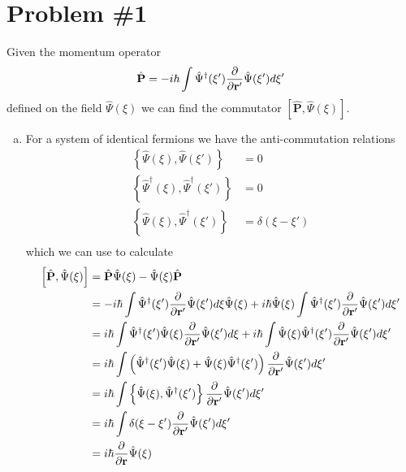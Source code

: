 \documentclass[11pt]{article}
\numberwithin{equation}{section}
\begin{document}


\section{Problem \#1}
Given the momentum operator
$$\hat{\mathbf{P}} = -i\hbar\int\hat{\Psi}^{\dagger}(\xi')\frac{\partial{}}{\partial{\mathbf{r}'}}\hat{\Psi}(\xi')d\xi'$$
defined on the field $\hat{\Psi}(\xi)$ we can find the commutator $[\hat{\mathbf{P}},\hat{\Psi}(\xi)]$.

\begin{enumerate}[(a)]
\item For a system of identical fermions we have the anti-commutation relations
\begin{align*}
\left\{\hat{\Psi}(\xi),\hat{\Psi}(\xi')\right\} &= 0\\
\left\{\hat{\Psi}^{\dagger}(\xi),\hat{\Psi}^{\dagger}(\xi')\right\} &= 0\\
\left\{\hat{\Psi}(\xi),\hat{\Psi}^{\dagger}(\xi')\right\} &= \delta(\xi-\xi')\\
\end{align*}
which we can use to calculate
\begin{align*}
\left[\hat{\mathbf{P}},\hat{\Psi}(\xi)\right] &= \hat{\mathbf{P}}\hat{\Psi}(\xi) - \hat{\Psi}(\xi)\hat{\mathbf{P}}\\
&= -i\hbar\int\hat{\Psi}^{\dagger}(\xi')\frac{\partial{}}{\partial{\mathbf{r}'}}\hat{\Psi}(\xi')d\xi\hat{\Psi}(\xi) + i\hbar\hat{\Psi}(\xi)\int\hat{\Psi}^{\dagger}(\xi')\frac{\partial{}}{\partial{\mathbf{r}'}}\hat{\Psi}(\xi')d\xi'\\
&= i\hbar\int\hat{\Psi}^{\dagger}(\xi')\hat{\Psi}(\xi)\frac{\partial{}}{\partial{\mathbf{r}'}}\hat{\Psi}(\xi')d\xi + i\hbar\int\hat{\Psi}(\xi)\hat{\Psi}^{\dagger}(\xi')\frac{\partial{}}{\partial{\mathbf{r}'}}\hat{\Psi}(\xi')d\xi'\\
&= i\hbar\int\left(\hat{\Psi}^{\dagger}(\xi')\hat{\Psi}(\xi) + \hat{\Psi}(\xi)\hat{\Psi}^{\dagger}(\xi')\right)\frac{\partial{}}{\partial{\mathbf{r}'}}\hat{\Psi}(\xi')d\xi'\\
&= i\hbar\int\left\{\hat{\Psi}(\xi),\hat{\Psi}^{\dagger}(\xi')\right\}\frac{\partial{}}{\partial{\mathbf{r}'}}\hat{\Psi}(\xi')d\xi'\\
&= i\hbar\int\delta(\xi-\xi')\frac{\partial{}}{\partial{\mathbf{r}'}}\hat{\Psi}(\xi')d\xi'\\
&= i\hbar\frac{\partial{}}{\partial{\mathbf{r}}}\hat{\Psi}(\xi)
\end{align*}


\end{enumerate}
\end{document}
